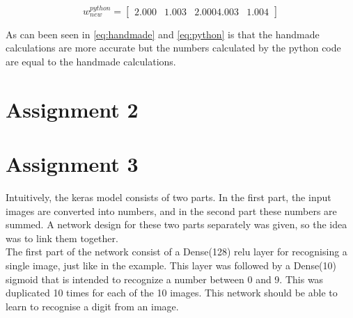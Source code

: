 \documentclass[a4paper,12pt]{article}
\begin{document}
\begin{equation}
w_{new}^{python}=
\begin{bmatrix} 2.000 &   1.003 & 2.000    4.003 & 1.004
\end{bmatrix}
\label{eq:python}
\end{equation}

As can been seen in \ref{eq:handmade} and \ref{eq:python} is that the handmade calculations are more accurate but the numbers calculated by the python code are equal to the handmade calculations. 


\section{Assignment 2}


%

\section{Assignment 3}
Intuitively, the keras model consists of two parts. In the first part, the input images are converted into numbers, and in the second part these numbers are summed. A network design for these two parts separately was given, so the idea was to link them together.\\

The first part of the network consist of a Dense(128) relu layer for recognising a single image, just like in the example. This layer was followed by a Dense(10) sigmoid that is intended to recognize a number between 0 and 9. This was duplicated 10 times for each of the 10 images. This network should be able to learn to recognise a digit from an image.
\end{document}
